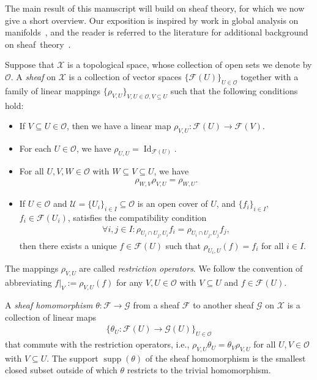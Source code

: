 \documentclass[10pt,a4paper]{amsart}
\theoremstyle{definition}
\theoremstyle{remark}
\numberwithin{equation}{section}
\newcommand{\calF}{{\mathcal F}}
\newcommand{\calG}{{\mathcal G}}
\newcommand{\calO}{{\mathcal O}}
\newcommand{\calU}{{\mathcal U}}
\newcommand{\calX}{{\mathcal X}}
\renewcommand{\restriction}{|}
\newcommand{\Id}{\operatorname{Id}}
\newcommand{\supp}{\operatorname{supp}}
\newcommand{\Cover}{\calU}
\begin{document}
The main result of this manuscript will build on sheaf theory, for which we now give a short overview.
Our exposition is inspired by work in global analysis on manifolds~\cite{goldshtein2011hodge,mitrea2008poisson},
and the reader is referred to the literature for additional background on sheaf~theory~\cite{stocker_zieschang}. 


Suppose that $\calX$ is a topological space, whose collection of open sets we denote by $\calO$. 
A \emph{sheaf} on $\calX$ is a collection of vector spaces $\{ \calF(U) \}_{U \in \calO}$
together with a family of linear mappings $\{ \rho_{V,U} \}_{ V, U \in \calO, V \subseteq U}$ such that the following conditions hold:
\begin{itemize}
    \item If $V \subseteq U \in \calO$, then we have a linear map $\rho_{V,U} : \calF(U) \to \calF(V)$.
    \item For each $U \in \calO$, we have $\rho_{U,U} = \Id_{\calF(U)}$.
    \item For all $U,V,W \in \calO$ with $W \subseteq V \subseteq U$, we have 
    \begin{align*}
        \rho_{W,V} \rho_{V,U} = \rho_{W,U}.
    \end{align*}
    \item 
    If $U \in \calO$ and $\Cover = \{ U_{i} \}_{i \in I} \subseteq \calO$ is an open cover of $U$, 
    and $\{ f_{i} \}_{i \in I}$, $f_{i} \in \calF(U_i)$, satisfies the compatibility condition
    \begin{align*}
        \forall i, j \in I : \rho_{U_{i} \cap U_{j}, U_{i}} f_{i} = \rho_{U_{i} \cap U_{j}, U_{j}} f_{j}
        ,
    \end{align*}
    then there exists a unique $f \in \calF(U)$ such that $\rho_{U_{i},U}(f) = f_{i}$ for all $i \in I$. 
\end{itemize}
The mappings $\rho_{V,U}$ are called \emph{restriction operators}. 
We follow the convention of abbreviating $f \restriction_{V} := \rho_{V,U}(f)$ for any $V, U \in \calO$ with $V \subseteq U$ and $f \in \calF(U)$.

A \emph{sheaf homomorphism} $\theta : \calF \to \calG$ from a sheaf $\calF$ to another sheaf $\calG$ on $\calX$ is a collection of linear maps 
\begin{align*}
    \{ \theta_{U} : \calF(U) \to \calG(U) \}_{U \in \calO}
\end{align*}
that commute with the restriction operators, i.e., $\rho_{V,U} \theta_{U} = \theta_{V} \rho_{V,U}$ for all $U, V \in \calO$ with $V \subseteq U$. 
The support $\supp(\theta)$ of the sheaf homomorphism is the smallest closed subset outside of which $\theta$ restricts to the trivial homomorphism.
\end{document}
